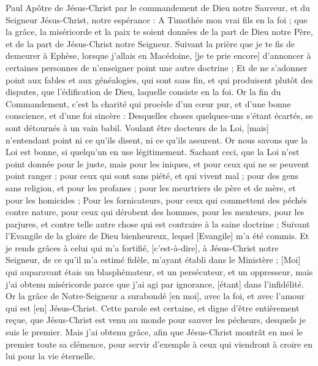 \BFont
\begin{multicols}{2}
\VerseOne{}Paul Apôtre de Jésus-Christ par le commandement de Dieu notre Sauveur, et du Seigneur Jésus-Christ, notre espérance :
A Timothée mon vrai fils en la foi ; que la grâce, la miséricorde et la paix te soient données de la part de Dieu notre Père, et de la part de Jésus-Christ notre Seigneur.
Suivant la prière que je te fis de demeurer à Ephèse, lorsque j'allais en Macédoine, [je te prie encore] d'annoncer à certaines personnes de n'enseigner point une autre doctrine ;
Et de ne s'adonner point aux fables et aux généalogies, qui sont sans fin, et qui produisent plutôt des disputes, que l'édification de Dieu, laquelle consiste en la foi.
Or la fin du Commandement, c'est la charité qui procède d'un cœur pur, et d'une bonne conscience, et d'une foi sincère :
Desquelles choses quelques-uns s'étant écartés, se sont détournés à un vain babil.
Voulant être docteurs de la Loi, [mais] n'entendant point ni ce qu'ils disent, ni ce qu'ils assurent.
Or nous savons que la Loi est bonne, si quelqu'un en use légitimement.
Sachant ceci, que la Loi n'est point donnée pour le juste, mais pour les iniques, et pour ceux qui ne se peuvent point ranger ; pour ceux qui sont sans piété, et qui vivent mal ; pour des gens sans religion, et pour les profanes ; pour les meurtriers de père et de mère, et pour les homicides ;
Pour les fornicateurs, pour ceux qui commettent des péchés contre nature, pour ceux qui dérobent des hommes, pour les menteurs, pour les parjures, et contre telle autre chose qui est contraire à la saine doctrine ;
Suivant l'Evangile de la gloire de Dieu bienheureux, lequel [Evangile] m'a été commis.
Et je rends grâces à celui qui m'a fortifié, [c'est-à-dire], à Jésus-Christ notre Seigneur, de ce qu'il m'a estimé fidèle, m'ayant établi dans le Ministère ;
[Moi] qui auparavant étais un blasphémateur, et un persécuteur, et un oppresseur, mais j'ai obtenu miséricorde parce que j'ai agi par ignorance, [étant] dans l'infidélité.
Or la grâce de Notre-Seigneur a surabondé [en moi], avec la foi, et avec l'amour qui est [en] Jésus-Christ.
Cette parole est certaine, et digne d'être entièrement reçue, que Jésus-Christ est venu au monde pour sauver les pécheurs, desquels je suis le premier.
Mais j'ai obtenu grâce, afin que Jésus-Christ montrât en moi le premier toute sa clémence, pour servir d'exemple à ceux qui viendront à croire en lui pour la vie éternelle.

\end{multicols}
